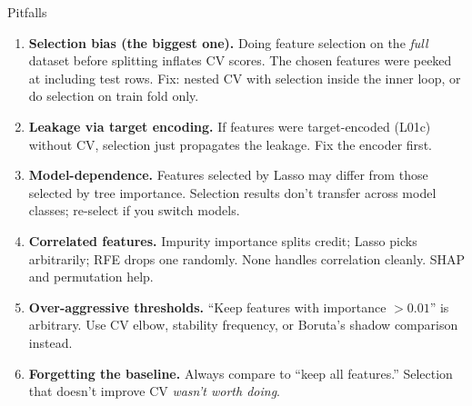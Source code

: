 \documentclass[aspectratio=169]{beamer}
\begin{document}
\begin{frame}{Pitfalls}
  \begin{enumerate}
    \item \textbf{Selection bias (the biggest one).} Doing feature selection on the \emph{full} dataset before splitting inflates CV scores. The chosen features were peeked at including test rows. Fix: nested CV with selection inside the inner loop, or do selection on train fold only.
    \item \textbf{Leakage via target encoding.} If features were target-encoded (L01c) without CV, selection just propagates the leakage. Fix the encoder first.
    \item \textbf{Model-dependence.} Features selected by Lasso may differ from those selected by tree importance. Selection results don't transfer across model classes; re-select if you switch models.
    \item \textbf{Correlated features.} Impurity importance splits credit; Lasso picks arbitrarily; RFE drops one randomly. None handles correlation cleanly. SHAP and permutation help.
    \item \textbf{Over-aggressive thresholds.} ``Keep features with importance $> 0.01$'' is arbitrary. Use CV elbow, stability frequency, or Boruta's shadow comparison instead.
    \item \textbf{Forgetting the baseline.} Always compare to ``keep all features.'' Selection that doesn't improve CV \emph{wasn't worth doing}.
  \end{enumerate}
\end{frame}
\end{document}
